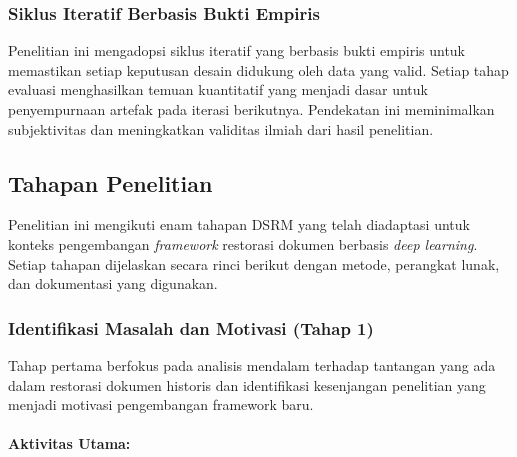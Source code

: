 \documentclass[12pt,a4paper]{article}
\begin{document}
\subsubsection{Siklus Iteratif Berbasis Bukti Empiris}
Penelitian ini mengadopsi siklus iteratif yang berbasis bukti empiris untuk memastikan setiap keputusan desain didukung oleh data yang valid. Setiap tahap evaluasi menghasilkan temuan kuantitatif yang menjadi dasar untuk penyempurnaan artefak pada iterasi berikutnya. Pendekatan ini meminimalkan subjektivitas dan meningkatkan validitas ilmiah dari hasil penelitian.

\subsection{Tahapan Penelitian}
\label{subsec:tahapan-penelitian}

Penelitian ini mengikuti enam tahapan DSRM yang telah diadaptasi untuk konteks pengembangan \textit{framework} restorasi dokumen berbasis \textit{deep learning}. Setiap tahapan dijelaskan secara rinci berikut dengan metode, perangkat lunak, dan dokumentasi yang digunakan.

\subsubsection{Identifikasi Masalah dan Motivasi (Tahap 1)}
Tahap pertama berfokus pada analisis mendalam terhadap tantangan yang ada dalam restorasi dokumen historis dan identifikasi kesenjangan penelitian yang menjadi motivasi pengembangan framework baru.

\paragraph{Aktivitas Utama:}
\end{document}

